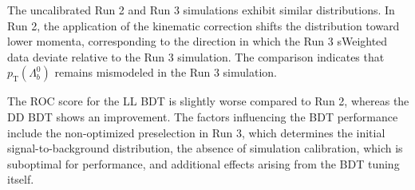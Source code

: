 The uncalibrated Run 2 and Run 3 simulations exhibit similar distributions. In Run 2, the application of the kinematic correction shifts the distribution toward lower momenta, corresponding to the direction in which the Run 3 sWeighted data deviate relative to the Run 3 simulation. The comparison indicates that $p_{\text{T}}(\Lambda_b^0)$ remains mismodeled in the Run 3 simulation.

The ROC score for the LL BDT is slightly worse compared to Run 2, whereas the DD BDT shows an improvement. The factors influencing the BDT performance include the non-optimized preselection in Run 3, which determines the initial signal-to-background distribution, the absence of simulation calibration, which is suboptimal for performance, and additional effects arising from the BDT tuning itself.

